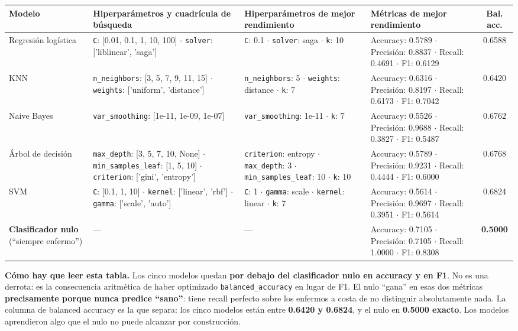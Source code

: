 \documentclass[10pt,a4paper]{article}
\begin{document}
\begin{table}[H]
\scriptsize
\begin{tabularx}{\textwidth}{@{}p{1.6cm} X p{2.7cm} p{3.4cm} c@{}}
\toprule
\textbf{Modelo} & \textbf{Hiperparámetros y cuadrícula de búsqueda} & \textbf{Hiperparámetros de mejor rendimiento} & \textbf{Métricas de mejor rendimiento} & \textbf{Bal. acc.} \\
\midrule
Regresión logística & \texttt{C}: [0.01, 0.1, 1, 10, 100] $\cdot$ \texttt{solver}: ['liblinear', 'saga'] & \texttt{C}: 0.1 $\cdot$ \texttt{solver}: saga $\cdot$ \texttt{k}: 10 & Accuracy: 0.5789 $\cdot$ Precisión: 0.8837 $\cdot$ Recall: 0.4691 $\cdot$ F1: 0.6129 & 0.6588 \\
KNN & \texttt{n\_neighbors}: [3, 5, 7, 9, 11, 15] $\cdot$ \texttt{weights}: ['uniform', 'distance'] & \texttt{n\_neighbors}: 5 $\cdot$ \texttt{weights}: distance $\cdot$ \texttt{k}: 7 & Accuracy: 0.6316 $\cdot$ Precisión: 0.8197 $\cdot$ Recall: 0.6173 $\cdot$ F1: 0.7042 & 0.6420 \\
Naive Bayes & \texttt{var\_smoothing}: [1e-11, 1e-09, 1e-07] & \texttt{var\_smoothing}: 1e-11 $\cdot$ \texttt{k}: 7 & Accuracy: 0.5526 $\cdot$ Precisión: 0.9688 $\cdot$ Recall: 0.3827 $\cdot$ F1: 0.5487 & 0.6762 \\
Árbol de decisión & \texttt{max\_depth}: [3, 5, 7, 10, None] $\cdot$ \texttt{min\_samples\_leaf}: [1, 5, 10] $\cdot$ \texttt{criterion}: ['gini', 'entropy'] & \texttt{criterion}: entropy $\cdot$ \texttt{max\_depth}: 3 $\cdot$ \texttt{min\_samples\_leaf}: 10 $\cdot$ \texttt{k}: 10 & Accuracy: 0.5789 $\cdot$ Precisión: 0.9231 $\cdot$ Recall: 0.4444 $\cdot$ F1: 0.6000 & 0.6768 \\
SVM & \texttt{C}: [0.1, 1, 10] $\cdot$ \texttt{kernel}: ['linear', 'rbf'] $\cdot$ \texttt{gamma}: ['scale', 'auto'] & \texttt{C}: 1 $\cdot$ \texttt{gamma}: scale $\cdot$ \texttt{kernel}: linear $\cdot$ \texttt{k}: 7 & Accuracy: 0.5614 $\cdot$ Precisión: 0.9697 $\cdot$ Recall: 0.3951 $\cdot$ F1: 0.5614 & 0.6824 \\
\midrule
\textbf{Clasificador nulo} (``siempre enfermo'') & --- & --- & Accuracy: 0.7105 $\cdot$ Precisión: 0.7105 $\cdot$ Recall: 1.0000 $\cdot$ F1: 0.8308 & \textbf{0.5000} \\
\bottomrule
\end{tabularx}
\end{table}

\textbf{Cómo hay que leer esta tabla.} Los cinco modelos quedan \textbf{por debajo del clasificador nulo en accuracy y en F1}. No es una derrota: es la consecuencia aritmética de haber optimizado \texttt{balanced\_accuracy} en lugar de F1. El nulo ``gana'' en esas dos métricas \textbf{precisamente porque nunca predice ``sano''}: tiene recall perfecto sobre los enfermos a costa de no distinguir absolutamente nada. La columna de balanced accuracy es la que separa: los cinco modelos están entre \textbf{0.6420 y 0.6824}, y el nulo en \textbf{0.5000 exacto}. Los modelos aprendieron algo que el nulo no puede alcanzar por construcción.
\end{document}
